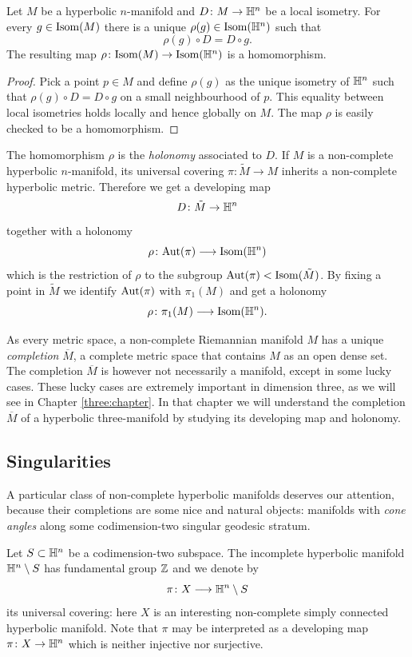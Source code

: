 \begin{prop}
Let $M$ be a hyperbolic $n$-manifold and $D\colon M \to \mathbb{H}^n$ be a local isometry. For every $g\in {\rm Isom}(M)$ there is a unique $\rho(g)\in {\rm Isom}(\mathbb{H}^n)$ such that
$$\rho(g) \circ D = D\circ g.$$
The resulting map $\rho \colon {\rm Isom}(M) \to {\rm Isom}(\mathbb{H}^n)$ is a homomorphism.
\end{prop}
\begin{proof}
Pick a point $p\in M$ and define $\rho(g)$ as the unique isometry of $\mathbb{H}^n$ such that $\rho(g) \circ D = D\circ g$ on a small neighbourhood of $p$. This equality between local isometries holds locally and hence globally on $M$. The map $\rho$ is easily checked to be a homomorphism.
\end{proof}

The homomorphism $\rho$ is the \emph{holonomy} associated to $D$. If $M$ is a non-complete hyperbolic $n$-manifold, its universal covering $\pi\colon \tilde M \to M$ inherits a non-complete hyperbolic metric. Therefore we get a developing map 
$$D\colon \tilde M \to \mathbb{H}^n$$ 
together with a holonomy 
$$\rho \colon {\rm Aut}(\pi) \longrightarrow {\rm Isom}(\mathbb{H}^n)$$
which is the restriction of $\rho$ to the subgroup ${\rm Aut}(\pi)<{\rm Isom}(\tilde M)$. By fixing a point in $\tilde M$ we identify ${\rm Aut}(\pi)$ with $\pi_1(M)$ and get a holonomy
$$\rho\colon \pi_1(M) \longrightarrow {\rm Isom}(\mathbb{H}^n).$$

As every metric space, a non-complete Riemannian manifold $M$ has a unique \emph{completion} $\overline M$, a complete metric space that contains $M$ as an open dense set. The completion $\overline M$ is however not necessarily a manifold, except in some lucky cases. These lucky cases are extremely important in dimension three, as we will see in Chapter \ref{three:chapter}. In that chapter we will understand the completion $\overline M$ of a hyperbolic three-manifold by studying its developing map and holonomy.

\subsection{Singularities} \label{singularities:subsection}
A particular class of non-complete hyperbolic manifolds deserves our attention, because their completions are some nice and natural objects: manifolds with \emph{cone angles} along some codimension-two singular geodesic stratum.

Let $S\subset \mathbb{H}^n$ be a codimension-two subspace. The incomplete hyperbolic manifold $\mathbb{H}^n \setminus S$ has fundamental group $\mathbb{Z}$ and we denote by
$$\pi \colon X \longrightarrow \mathbb{H}^n \setminus S$$
its universal covering: here $X$ is an interesting non-complete simply connected hyperbolic manifold. Note that $\pi$ may be interpreted as a developing map $\pi\colon X\to \mathbb{H}^n$ which is neither injective nor surjective.

